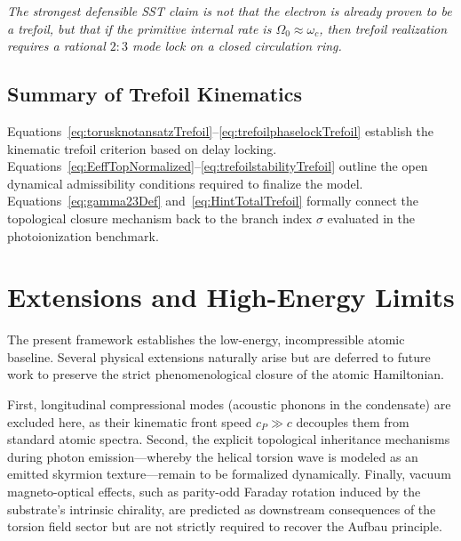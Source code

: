 \documentclass[11pt,a4paper]{article}
\begin{document}
        \medskip\noindent\textit{The strongest defensible SST claim is not that the electron is already proven to be a trefoil, but that if the primitive internal rate is $\Omega_0 \approx \omega_c$, then trefoil realization requires a rational $2{:}3$ mode lock on a closed circulation ring.}
    
    \subsection{Summary of Trefoil Kinematics}
        Equations~\eqref{eq:torusknotansatzTrefoil}--\eqref{eq:trefoilphaselockTrefoil} establish the kinematic trefoil criterion based on delay locking. Equations~\eqref{eq:EeffTopNormalized}--\eqref{eq:trefoilstabilityTrefoil} outline the open dynamical admissibility conditions required to finalize the model. Equations~\eqref{eq:gamma23Def} and~\eqref{eq:HintTotalTrefoil} formally connect the topological closure mechanism back to the branch index \(\sigma\) evaluated in the photoionization benchmark.
    
    \section{Extensions and High-Energy Limits}
    \label{sec:extensions}
    The present framework establishes the low-energy, incompressible atomic baseline. Several physical extensions naturally arise but are deferred to future work to preserve the strict phenomenological closure of the atomic Hamiltonian.
    
    First, longitudinal compressional modes (acoustic phonons in the condensate) are excluded here, as their kinematic front speed $c_P \gg c$ decouples them from standard atomic spectra. Second, the explicit topological inheritance mechanisms during photon emission---whereby the helical torsion wave is modeled as an emitted skyrmion texture---remain to be formalized dynamically. Finally, vacuum magneto-optical effects, such as parity-odd Faraday rotation induced by the substrate's intrinsic chirality, are predicted as downstream consequences of the torsion field sector but are not strictly required to recover the Aufbau principle.
    
\end{document}
